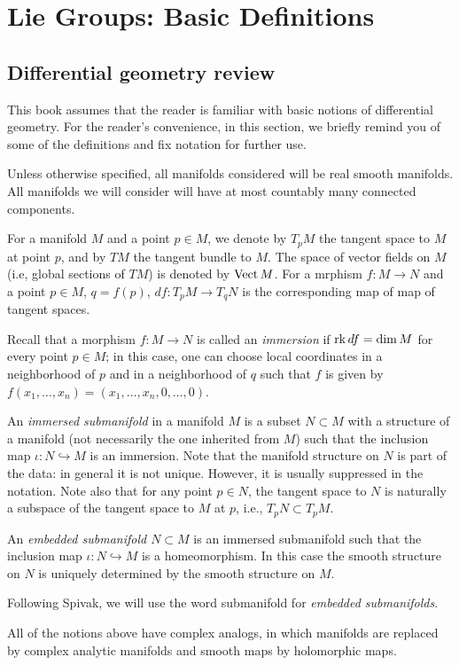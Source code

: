 \chapter{Lie Groups: Basic Definitions}
\section{Differential geometry review}
This book assumes that the reader is familiar with basic notions of
differential geometry. For the reader's convenience, in this section, we
briefly remind you of some of the definitions and fix notation for further
use.

Unless otherwise specified, all manifolds considered will be real smooth
manifolds. All manifolds we will consider will have at most countably many
connected components.

For a manifold $M$ and a point $p\in M$, we denote by $T_pM$ the tangent
space to $M$ at point $p$, and by $TM$ the tangent bundle to $M$. The space
of vector fields on $M$ (i.e, global sections of $TM$) is denoted by
$\operatorname{Vect} M$. For a mrphism $f\colon M\to N$ and a point $p\in M$,
$q= f(p)$, $df\colon T_pM\to T_qN$ is the corresponding map of map
of tangent spaces.

Recall that a morphism $f\colon M\to N$ is called an \emph{immersion} if
$\operatorname{rk} df=\dim M$ for every point $p\in M$; in this case, one can choose
local coordinates in a neighborhood of $p$ and in a neighborhood of $q$
such that $f$ is given by $f(x_1,\dotsc,x_n)=(x_1,\dotsc,x_n,0,\dotsc,0)$.

An \emph{immersed submanifold} in a manifold $M$ is a subset $N\subset M$
with a structure of a manifold (not necessarily the one inherited from $M$)
such that the inclusion map $\iota\colon N\hookrightarrow M$ is an
immersion. Note that the manifold structure on $N$ is part of the data: in
general it is not unique. However, it is usually suppressed in the
notation. Note also that for any point $p\in N$, the tangent space to $N$
is naturally a subspace of the tangent space to $M$ at $p$, i.e.,
$T_pN\subset T_pM$.

An \emph{embedded submanifold $N\subset M$} is an immersed submanifold such
that the inclusion map $\iota\colon N\hookrightarrow M$ is a
homeomorphism. In this case the smooth structure on $N$ is uniquely
determined by the smooth structure on $M$.

Following Spivak, we will use the word submanifold for \emph{embedded
  submanifolds}.

All of the notions above have complex analogs, in which manifolds are
replaced by complex analytic manifolds and smooth maps by holomorphic maps.

